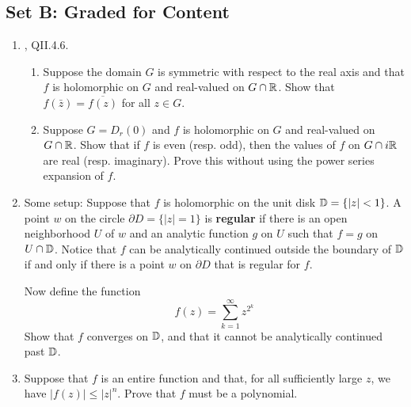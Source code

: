 \documentclass[../psets.tex]{subfiles}
\begin{document}
\subsection*{Set B: Graded for Content}
\begin{enumerate}[label={\textbf{\arabic*.}}]
    \item \textcite{bib:FischerLieb}, QII.4.6.
    \begin{enumerate}
        \item Suppose the domain $G$ is symmetric with respect to the real axis and that $f$ is holomorphic on $G$ and real-valued on $G\cap\mathbb{R}$. Show that $f(\bar{z})=\overline{f(z)}$ for all $z\in G$.
        \item Suppose $G=D_r(0)$ and $f$ is holomorphic on $G$ and real-valued on $G\cap\mathbb{R}$. Show that if $f$ is even (resp. odd), then the values of $f$ on $G\cap i\mathbb{R}$ are real (resp. imaginary). Prove this without using the power series expansion of $f$.
    \end{enumerate}
    \item Some setup: Suppose that $f$ is holomorphic on the unit disk $\mathbb{D}=\{|z|<1\}$. A point $w$ on the circle $\partial D=\{|z|=1\}$ is \textbf{regular} if there is an open neighborhood $U$ of $w$ and an analytic function $g$ on $U$ such that $f=g$ on $U\cap\mathbb{D}$. Notice that $f$ can be analytically continued outside the boundary of $\mathbb{D}$ if and only if there is a point $w$ on $\partial D$ that is regular for $f$.\par
    Now define the function
    \begin{equation*}
        f(z) = \sum_{k=1}^\infty z^{2^k}
    \end{equation*}
    Show that $f$ converges on $\mathbb{D}$, and that it cannot be analytically continued past $\mathbb{D}$.
    \item Suppose that $f$ is an entire function and that, for all sufficiently large $z$, we have $|f(z)|\leq|z|^n$. Prove that $f$ must be a polynomial.
\end{enumerate}
\end{document}
